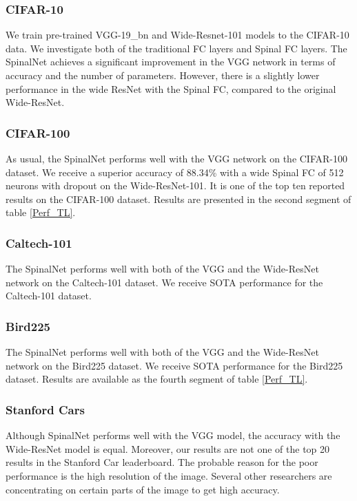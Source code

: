 \documentclass[journal]{IEEEtran}
\begin{document}
\subsubsection{CIFAR-10}
We train pre-trained VGG-19\_bn and Wide-Resnet-101 models to the CIFAR-10 data. We investigate both of the traditional FC layers and Spinal FC layers. The SpinalNet achieves a significant improvement in the VGG network in terms of accuracy and the number of parameters. However, there is a slightly lower performance in the wide ResNet with the Spinal FC, compared to the original Wide-ResNet. 

\subsubsection{CIFAR-100}
As usual, the SpinalNet performs well with the VGG network on the CIFAR-100 dataset. We receive a superior accuracy of 88.34\% with a wide Spinal FC of 512 neurons with dropout on the Wide-ResNet-101. It is one of the top ten reported results on the CIFAR-100 dataset. Results are presented in the second segment of table \ref{Perf_TL}.

\subsubsection{Caltech-101}
The SpinalNet performs well with both of the VGG and the Wide-ResNet network on the Caltech-101 dataset. We receive SOTA performance for the Caltech-101 dataset.

\subsubsection{Bird225}
The SpinalNet performs well with both of the VGG and the Wide-ResNet network on the Bird225 dataset. We receive SOTA performance for the Bird225 dataset. Results are available as the fourth segment of table \ref{Perf_TL}.

\subsubsection{Stanford Cars}
Although SpinalNet performs well with the VGG model, the accuracy with the Wide-ResNet model is equal. Moreover, our results are not one of the top 20 results in the Stanford Car leaderboard. The probable reason for the poor performance is the high resolution of the image. Several other researchers are concentrating on certain parts of the image to get high accuracy.  
\end{document}
